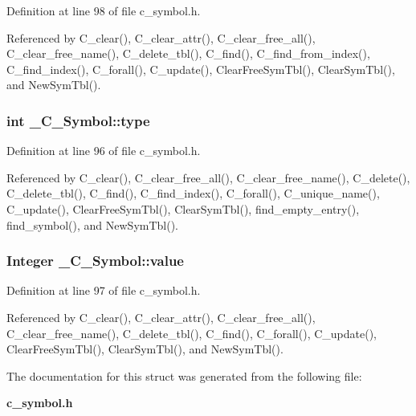 Definition at line 98 of file c\_\-symbol.h.

Referenced by C\_\-clear(), C\_\-clear\_\-attr(), C\_\-clear\_\-free\_\-all(), C\_\-clear\_\-free\_\-name(), C\_\-delete\_\-tbl(), C\_\-find(), C\_\-find\_\-from\_\-index(), C\_\-find\_\-index(), C\_\-forall(), C\_\-update(), Clear\-Free\-Sym\-Tbl(), Clear\-Sym\-Tbl(), and New\-Sym\-Tbl().
\subsubsection{\setlength{\rightskip}{0pt plus 5cm}int \bf{\_\-C\_\-Symbol::type}}\label{struct__C__Symbol_0fafabe2c934dfe616e3036dca2b300c}




Definition at line 96 of file c\_\-symbol.h.

Referenced by C\_\-clear(), C\_\-clear\_\-free\_\-all(), C\_\-clear\_\-free\_\-name(), C\_\-delete(), C\_\-delete\_\-tbl(), C\_\-find(), C\_\-find\_\-index(), C\_\-forall(), C\_\-unique\_\-name(), C\_\-update(), Clear\-Free\-Sym\-Tbl(), Clear\-Sym\-Tbl(), find\_\-empty\_\-entry(), find\_\-symbol(), and New\-Sym\-Tbl().
\subsubsection{\setlength{\rightskip}{0pt plus 5cm}\bf{Integer} \bf{\_\-C\_\-Symbol::value}}\label{struct__C__Symbol_c30fcf5f353b69d3031d206a54bd1ed7}




Definition at line 97 of file c\_\-symbol.h.

Referenced by C\_\-clear(), C\_\-clear\_\-attr(), C\_\-clear\_\-free\_\-all(), C\_\-clear\_\-free\_\-name(), C\_\-delete\_\-tbl(), C\_\-find(), C\_\-forall(), C\_\-update(), Clear\-Free\-Sym\-Tbl(), Clear\-Sym\-Tbl(), and New\-Sym\-Tbl().

The documentation for this struct was generated from the following file:\begin{CompactItemize}
\item 
\bf{c\_\-symbol.h}\end{CompactItemize}

